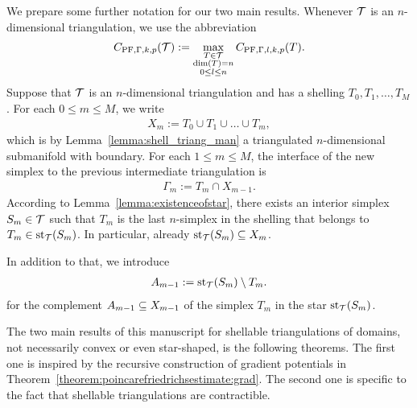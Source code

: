 \documentclass[10pt,a4paper]{article}
\begin{document}
We prepare some further notation for our two main results. 
Whenever ${\mathcal T}$ is an $n$-dimensional triangulation, we use the abbreviation
\begin{align*}
    C_{{\rm PF},\Gamma,k,p}({\mathcal T}) 
    :=
    \max\limits_{ \substack{ T \in {\mathcal T} \\ \dim(T)=n \\ 0 \leq l \leq n } }
    C_{{\rm PF},\Gamma,l,k,p}(T)
    .
\end{align*}
Suppose that ${\mathcal T}$ is an $n$-dimensional triangulation and has a shelling $T_{0}, T_{1}, \dots, T_{M}$. 
For each $0 \leq m \leq M$, we write 
\begin{align*}
    X_{m} := T_0 \cup T_1 \cup \dots \cup T_{m},
\end{align*}
which is by Lemma~\ref{lemma:shell_triang_man} a triangulated $n$-dimensional submanifold with boundary. 
For each $1 \leq m \leq M$, the interface of the new simplex to the previous intermediate triangulation is 
\begin{align*}
    \Gamma_{m} := T_{m} \cap X_{m-1} %
    .
\end{align*}
According to Lemma~\ref{lemma:existenceofstar}, 
there exists an interior simplex $S_{m} \in {\mathcal T}$ 
such that $T_{m}$ is the last $n$-simplex in the shelling that belongs to $T_{m} \in \operatorname{st}_{{\mathcal T}}(S_{m})$.
In particular, already $\operatorname{st}_{{\mathcal T}}(S_{m}) \subseteq X_{m}$. %

In addition to that, we introduce 
\begin{align*}
    A_{m-1} := \operatorname{st}_{{\mathcal T}}(S_{m}) \setminus T_{m}.
\end{align*}
for the complement $A_{m-1} \subseteq X_{m-1}$ of the simplex $T_{m}$ in the star $\operatorname{st}_{{\mathcal T}}(S_{m})$. 

The two main results of this manuscript for shellable triangulations of domains, not necessarily convex or even star-shaped, is the following theorems. 
The first one is inspired by the recursive construction of gradient potentials in Theorem~\ref{theorem:poincarefriedrichsestimate:grad}.
The second one is specific to the fact that shellable triangulations are contractible.
\end{document}
